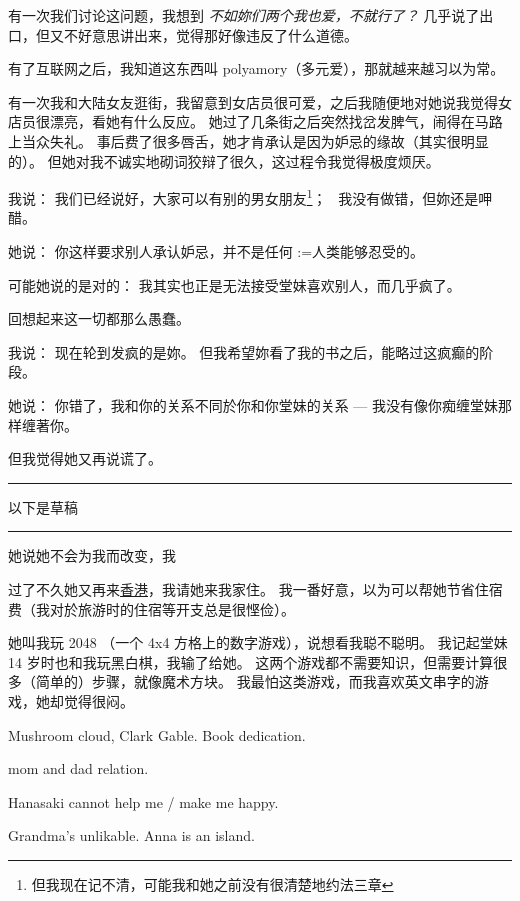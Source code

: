 \documentclass[12pt]{report}
\makeatletter
\newcommand{\speechCn}[1]{\textrm{\textit{\textcolor{Speech}{#1}}}}
\renewcommand{\d}[1]{$\underaccent{\scalebox{0.5}{\textbullet}}{\textrm{#1}}$}
\newcommand{\ds}[1]{%
  \@tfor\next:=#1\do{\d{\next}}}
\newcommand*\todo{\begin{center}\color{red}  \rule{5cm}{0.5pt} 以下是草稿\, \rule{5cm}{0.5pt} \end{center}}
\makeatother
\begin{document}
{有一次我们讨论这问题，我想到 \speechCn{不如妳们两个我也爱，不就行了？} 几乎说了出口，但又不好意思讲出来，觉得那好像违反了什么道德。

有了互联网之后，我知道这东西叫 polyamory（多元爱），那就越来越习以为常。

有一次我和大陆女友逛街，我留意到女店员很可爱，之后我随便地对她说我觉得女店员很漂亮，看她有什么反应。 她过了几条街之后突然找岔发脾气，闹得在马路上当众失礼。  事后费了很多唇舌，她才肯承认是因为妒忌的缘故（其实很明显的）。  但她对我不诚实地砌词狡辩了很久，这过程令我觉得极度烦厌。

我说： 我们已经说好，大家可以有别的男女朋友\footnote{但我现在记不清，可能我和她之前没有很清楚地约法三章}；~ 我没有做错，但妳还是呷醋。

她说： 你这样要求别人承认妒忌，并不是任何\ds{人类}能够忍受的。

可能她说的是对的：  我其实也正是无法接受堂妹喜欢别人，而几乎疯了。

回想起来这一切都那么愚蠢。

我说： 现在轮到发疯的是妳。  但我希望妳看了我的书之后，能略过这疯癫的阶段。

她说： 你错了，我和你的关系不同於你和你堂妹的关系 --- 我没有像你痴缠堂妹那样缠著你。

但我觉得她又再说谎了。

\todo

她说她不会为我而改变，我

过了不久她又再来\uline{香港}，我请她来我家住。 我一番好意，以为可以帮她节省住宿费（我对於旅游时的住宿等开支总是很悭俭）。


她叫我玩 2048 （一个 4x4 方格上的数字游戏），说想看我聪不聪明。 我记起堂妹 14 岁时也和我玩黑白棋，我输了给她。  这两个游戏都不需要知识，但需要计算很多（简单的）步骤，就像魔术方块。  我最怕这类游戏，而我喜欢英文串字的游戏，她却觉得很闷。

Mushroom cloud, Clark Gable.  Book dedication.

mom and dad relation.

Hanasaki cannot help me / make me happy.

Grandma's unlikable.  Anna is an island.


}
\end{document}
